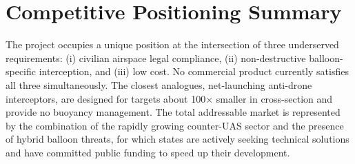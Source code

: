  \vspace{-10pt}
\section{Competitive Positioning Summary}
\label{subsec:positioning}
 
The project occupies a unique position at the intersection of three underserved requirements: (i) civilian airspace legal compliance,
(ii) non-destructive balloon-specific interception, and (iii) low cost. No commercial product currently satisfies all three simultaneously. The closest analogues, net-launching anti-drone interceptors, are designed for targets about 100$\times$ smaller in cross-section and provide no buoyancy management. The total addressable market is represented by the combination of the rapidly growing counter-UAS sector and the presence of hybrid balloon threats, for which states are actively seeking technical solutions and have committed public funding to speed up their development.






